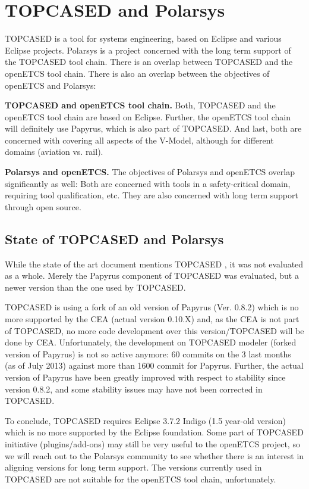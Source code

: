 \section{TOPCASED and Polarsys}

TOPCASED is a tool for systems engineering, based on Eclipse and various Eclipse projects.  Polarsys is a project concerned with the long term support of the TOPCASED tool chain.  There is an overlap between TOPCASED and the openETCS tool chain.  There is also an overlap between the objectives of openETCS and Polarsys:

\textbf{TOPCASED and openETCS tool chain.} Both, TOPCASED and the openETCS tool chain are based on Eclipse.  Further, the openETCS tool chain will definitely use Papyrus, which is also part of TOPCASED.  And last, both are concerned with covering all aspects of the V-Model, although for different domains (aviation vs. rail).

\textbf{Polarsys and openETCS.}  The objectives of Polarsys and openETCS overlap significantly as well: Both are concerned with tools in a safety-critical domain, requiring tool qualification, etc.  They are also concerned with long term support through open source.

\subsection{State of TOPCASED and Polarsys}

While the state of the art document mentions TOPCASED \citep{D2_1}, it was not evaluated as a whole.  Merely the Papyrus component of TOPCASED was evaluated, but a newer version than the one used by TOPCASED.

TOPCASED is using a fork of an old version of Papyrus (Ver. 0.8.2) which is no more supported by the CEA (actual version 0.10.X) and, as the CEA is not part of TOPCASED, no more code development over this version/TOPCASED will be done by CEA.  Unfortunately, the development on TOPCASED modeler (forked version of Papyrus) is not so active anymore: 60 commits on the 3 last months (as of July 2013) against more than 1600 commit for Papyrus.  Further, the actual version of Papyrus have been greatly improved with respect to stability since version 0.8.2, and some stability issues may have not been corrected in TOPCASED.

To conclude, TOPCASED requires Eclipse 3.7.2 Indigo (1.5 year-old version) which is no more supported by the Eclipse foundation.  Some part of TOPCASED initiative (plugins/add-ons) may still be very useful to the openETCS project, so we will reach out to the Polarsys community to see whether there is an interest in aligning versions for long term support.  The versions currently used in TOPCASED are not suitable for the openETCS tool chain, unfortunately.

